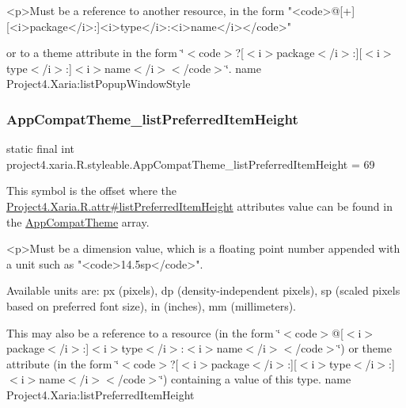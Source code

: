 \begin{DoxyVerb}      <p>Must be a reference to another resource, in the form "<code>@[+][<i>package</i>:]<i>type</i>:<i>name</i></code>"
\end{DoxyVerb}
 or to a theme attribute in the form \char`\"{}$<$code$>$?\mbox{[}$<$i$>$package$<$/i$>$\+:\mbox{]}\mbox{[}$<$i$>$type$<$/i$>$\+:\mbox{]}$<$i$>$name$<$/i$>$$<$/code$>$\char`\"{}.  name Project4.\+Xaria\+:list\+Popup\+Window\+Style \mbox{\label{classproject4_1_1xaria_1_1R_1_1styleable_a6f1d16f32d0ee16e2782714f155092ff}} 
\subsubsection{\texorpdfstring{App\+Compat\+Theme\+\_\+list\+Preferred\+Item\+Height}{AppCompatTheme\_listPreferredItemHeight}}
{\footnotesize\ttfamily static final int project4.\+xaria.\+R.\+styleable.\+App\+Compat\+Theme\+\_\+list\+Preferred\+Item\+Height = 69\hspace{0.3cm}{\ttfamily [static]}}

This symbol is the offset where the \hyperlink{}{Project4.\+Xaria.\+R.\+attr\#list\+Preferred\+Item\+Height} attribute\textquotesingle{}s value can be found in the \hyperlink{classproject4_1_1xaria_1_1R_1_1styleable_aad8bec413e2350f9404e6ff0e831a85d}{App\+Compat\+Theme} array.

\begin{DoxyVerb}      <p>Must be a dimension value, which is a floating point number appended with a unit such as "<code>14.5sp</code>".
\end{DoxyVerb}
 Available units are\+: px (pixels), dp (density-\/independent pixels), sp (scaled pixels based on preferred font size), in (inches), mm (millimeters). 

This may also be a reference to a resource (in the form \char`\"{}$<$code$>$@\mbox{[}$<$i$>$package$<$/i$>$\+:\mbox{]}$<$i$>$type$<$/i$>$\+:$<$i$>$name$<$/i$>$$<$/code$>$\char`\"{}) or theme attribute (in the form \char`\"{}$<$code$>$?\mbox{[}$<$i$>$package$<$/i$>$\+:\mbox{]}\mbox{[}$<$i$>$type$<$/i$>$\+:\mbox{]}$<$i$>$name$<$/i$>$$<$/code$>$\char`\"{}) containing a value of this type.  name Project4.\+Xaria\+:list\+Preferred\+Item\+Height \mbox{\label{classproject4_1_1xaria_1_1R_1_1styleable_a950e1a218f4b3586130f637e6ddfdcfb}} 
